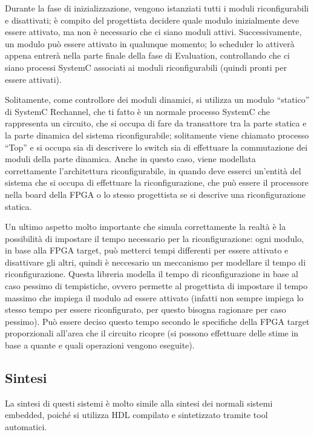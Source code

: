 \documentclass[a4paper,titlepage]{book}
\begin{document}
Durante la fase di inizializzazione, vengono istanziati tutti i moduli riconfigurabili e disattivati; è compito del progettista decidere quale modulo inizialmente deve essere attivato, ma non è necessario che ci siano moduli attivi. Successivamente, un modulo può essere attivato in qualunque momento; lo scheduler lo attiverà appena entrerà nella parte finale della fase di Evaluation, controllando che ci siano processi SystemC associati ai moduli riconfigurabili (quindi pronti per essere attivati). 

Solitamente, come controllore dei moduli dinamici, si utilizza un modulo ``statico'' di SystemC Rechannel, che ti fatto è un normale processo SystemC che rappresenta un circuito, che si occupa di fare da transattore tra la parte statica e la parte dinamica del sistema riconfigurabile; solitamente viene chiamato processo ``Top'' e si occupa sia di descrivere lo switch sia di effettuare la commutazione dei moduli della parte dinamica. Anche in questo caso, viene modellata correttamente l'architettura riconfigurabile, in quando deve esserci un'entità del sistema che si occupa di effettuare la riconfigurazione, che può essere il processore nella board della FPGA o lo stesso progettista se si descrive una riconfigurazione statica.

Un ultimo aspetto molto importante che simula correttamente la realtà è la possibilità di impostare il tempo necessario per la riconfigurazione: ogni modulo, in base alla FPGA target, può metterci tempi differenti per essere attivato e disattivare gli altri, quindi è neccesario un meccanismo per modellare il tempo di riconfigurazione. Questa libreria modella il tempo di riconfigurazione in base al caso pessimo di tempistiche, ovvero permette al progettista di impostare il tempo massimo che impiega il modulo ad essere attivato (infatti non sempre impiega lo stesso tempo per essere riconfigurato, per questo bisogna ragionare per caso pessimo). Può essere deciso questo tempo secondo le specifiche della FPGA target proporzionali all'area che il circuito ricopre (si possono effettuare delle stime in base a quante e quali operazioni vengono eseguite).


\subsection{Sintesi}

La sintesi di questi sistemi è molto simile alla sintesi dei normali sistemi embedded, poiché si utilizza HDL compilato e sintetizzato tramite tool automatici.
\end{document}
